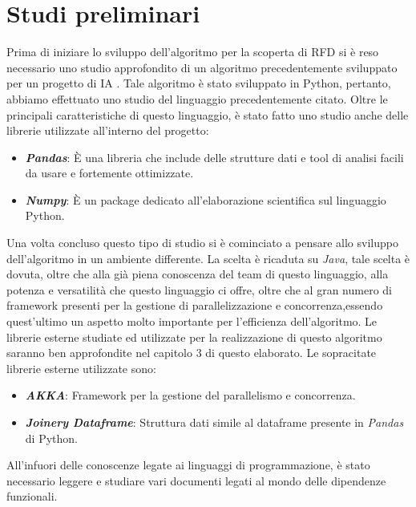 \section{Studi preliminari}
Prima di iniziare lo sviluppo dell'algoritmo per la scoperta di RFD si è reso necessario uno studio approfondito di un algoritmo precedentemente sviluppato per un progetto di IA \cite{tesinaIA}.
Tale algoritmo è stato sviluppato in Python, pertanto, abbiamo effettuato uno studio del linguaggio precedentemente citato.
Oltre le principali caratteristiche di questo linguaggio, è stato fatto uno studio anche delle librerie utilizzate all'interno del progetto:
\begin{itemize}
	\item \textbf{\emph{Pandas}}: È una libreria che include delle strutture dati e tool di analisi facili da usare e fortemente ottimizzate. 
	\item \textbf{\emph{Numpy}}: È un package dedicato all'elaborazione scientifica sul linguaggio Python.
\end{itemize}
Una volta concluso questo tipo di studio si è cominciato a pensare allo sviluppo dell'algoritmo in un ambiente differente.
La scelta è ricaduta su \emph{Java}, tale scelta è dovuta, oltre che alla già piena conoscenza del team di questo linguaggio, alla potenza e versatilità che questo linguaggio ci offre, oltre che al gran numero di framework presenti per la gestione di parallelizzazione e concorrenza,essendo quest'ultimo un aspetto molto importante per l'efficienza dell'algoritmo.
Le librerie esterne studiate ed utilizzate per la realizzazione di questo algoritmo saranno ben approfondite nel capitolo 3 di questo elaborato.
Le sopracitate librerie esterne utilizzate sono:
\begin{itemize}
	\item \textbf{\emph{AKKA}}: Framework per la gestione del parallelismo e concorrenza.
	\item \textbf{\emph{Joinery Dataframe}}: Struttura dati simile al dataframe presente in \emph{Pandas} di Python.
\end{itemize}
All'infuori delle conoscenze legate ai linguaggi di programmazione, è stato necessario leggere e studiare vari documenti legati al mondo delle dipendenze funzionali. 
